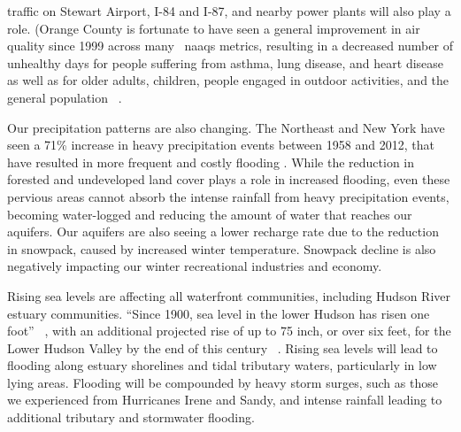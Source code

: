 traffic on Stewart Airport, I-84 and I-87, and nearby power plants will also 
play a role. (Orange County is fortunate to have seen a general improvement in 
air quality since 1999 across many ~\gls{naaqs} metrics, resulting in a decreased 
number of unhealthy days for people suffering from asthma, lung disease, and 
heart disease as well as for older adults, children, people engaged in outdoor 
activities, and the general population ~\citep{aircompare, ocnysenvironmental}. 
\par
Our precipitation patterns are also changing. The Northeast and New York have 
seen a 71\% increase in heavy precipitation events between 1958 and 2012, that 
have resulted in more frequent and costly flooding \citep{melillo2014}. 
While the reduction in forested and undeveloped land cover plays a role in 
increased flooding, even these pervious areas cannot absorb the intense rainfall 
from heavy precipitation events, becoming water-logged and reducing the amount 
of water that reaches our aquifers. Our aquifers are also seeing a lower 
recharge rate due to the reduction in snowpack, caused by increased winter 
temperature. Snowpack decline is also negatively impacting our winter 
recreational industries and economy.
\par
Rising sea levels are affecting all waterfront communities, including Hudson 
River estuary communities. ``Since 1900, sea level in the lower Hudson has 
risen one foot'' ~\citep{haeckel2014}, with an additional projected rise of up 
to 75 inch, or over six feet, for the Lower Hudson Valley by the end of this 
century ~\citep{horton2014climate}. Rising sea levels will lead to flooding along 
estuary shorelines and tidal tributary waters, particularly in low lying areas. 
Flooding will be compounded by heavy storm surges, such as those we experienced 
from Hurricanes Irene and Sandy, and intense rainfall leading to additional 
tributary and stormwater flooding.

\label{map:coastalclimatechange}
